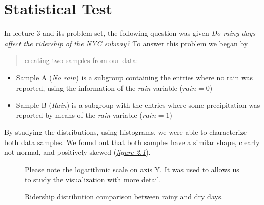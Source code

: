 \documentclass[letterpaper,10pt,english]{sphinxmanual}
\begin{document}
\chapter{Statistical Test}
\label{section1:statistical-test}\label{section1::doc}
In lecture 3 and its problem set, the following question was given \emph{Do rainy}
\emph{days affect the ridership of the NYC subway?} To answer this problem we began by
\begin{quote}

creating two samples from our data:
\end{quote}
\begin{itemize}
\item {} 
Sample A (\emph{No rain}) is a subgroup containing the entries where no rain was reported, using the
information of the \emph{rain} variable (\(rain = 0\))

\item {} 
Sample B (\emph{Rain}) is a subgroup with the entries where some precipitation was reported
by means of the \emph{rain} variable (\(rain = 1\))

\end{itemize}

By studying the distributions, using histograms, we were able to characterize
both data samples. We found out that both samples have a similar shape, clearly
not normal, and positively skewed ({\hyperref[section1:figure21]{\emph{figure 2.1}}}).
\begin{figure}[htbp]
\centering
\capstart

\caption{Ridership distribution comparison between rainy and dry days.}{\small 
Please note the logarithmic scale on axis Y. It was used to allows us to study
the visualization with more detail.
}\label{section1:figure21}\end{figure}
\end{document}
